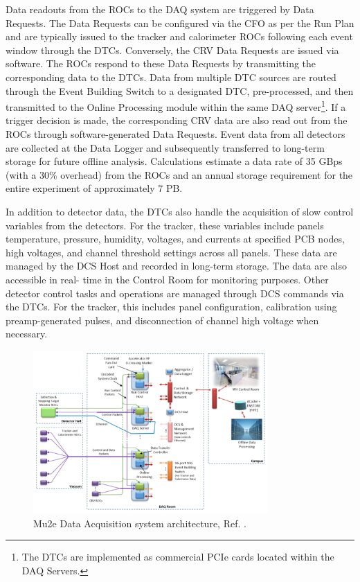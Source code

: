Data readouts from the ROCs to the DAQ system are triggered by Data Requests. 
The Data Requests can be configured via the CFO as per the Run Plan and are 
typically issued to the tracker and calorimeter ROCs following each event 
window through the DTCs. Conversely, the CRV Data Requests are issued via 
software. The ROCs respond to these Data Requests by transmitting the 
corresponding data to the DTCs. Data from multiple DTC sources are routed 
through the Event Building Switch to a designated DTC, pre-processed, and 
then transmitted to the Online Processing module within the same DAQ 
server\footnote{The DTCs are implemented as commercial PCIe cards located 
within the DAQ Servers.}. If a trigger decision is made, the corresponding 
CRV data are also read out from the ROCs through software-generated Data 
Requests. Event data from all detectors are collected at the Data Logger 
and subsequently transferred to long-term storage for future offline 
analysis. Calculations estimate a data rate of 35 GBps (with a 30\% overhead) 
from the ROCs and an annual storage requirement for the entire experiment of 
approximately 7 PB. 

In addition to detector data, the DTCs also handle the acquisition of 
slow control variables from the detectors. For the tracker, these variables 
include panels temperature, pressure, humidity, voltages, and currents at 
specified PCB nodes, high voltages, and channel threshold settings across 
all panels. These data are managed by the DCS Host and recorded in long-term 
storage. The data are also accessible in real- time in the Control Room for 
monitoring purposes. Other detector control tasks and operations are managed 
through DCS commands via the DTCs. For the tracker, this includes panel 
configuration, calibration using preamp-generated pulses, and disconnection 
of channel high voltage when necessary. 

\begin{figure}[!h]
    \centering
    \includegraphics[width =0.8\textwidth]{figures/png/Screenshot_20240206_144803.png}
    \caption{Mu2e Data Acquisition system architecture, Ref. \cite{GIOIOSA2023167732}.}
    \label{fig:linktodaq}
    \end{figure}


